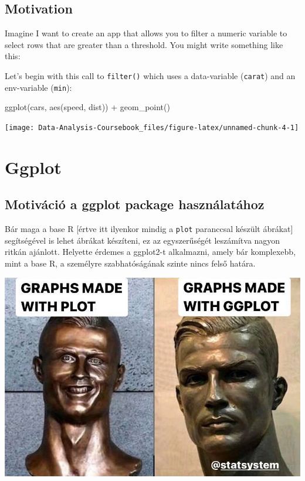 \documentclass[
]{article}
\newenvironment{Shaded}{\begin{snugshade}}{\end{snugshade}}
\newcommand{\FunctionTok}[1]{\textcolor[rgb]{0.00,0.00,0.00}{#1}}
\newcommand{\NormalTok}[1]{#1}
\newcommand{\SpecialCharTok}[1]{\textcolor[rgb]{0.00,0.00,0.00}{#1}}
\begin{document}
\hypertarget{tidy-motivation}{%
\subsection{Motivation}\label{tidy-motivation}}

Imagine I want to create an app that allows you to filter a numeric variable to select rows that are greater than a threshold.
You might write something like this:

Let's begin with this call to \texttt{filter()} which uses a data-variable (\texttt{carat}) and an env-variable (\texttt{min}):

\begin{Shaded}
\begin{Highlighting}[]
\FunctionTok{ggplot}\NormalTok{(cars, }\FunctionTok{aes}\NormalTok{(speed, dist)) }\SpecialCharTok{+} 
  \FunctionTok{geom\_point}\NormalTok{()}
\end{Highlighting}
\end{Shaded}

\begin{center}\texttt{[image: Data-Analysis-Coursebook\_files/figure-latex/unnamed-chunk-4-1]} \end{center}

\hypertarget{seminar4}{%
\section{Ggplot}\label{seminar4}}

\hypertarget{motivuxe1ciuxf3-a-ggplot-package-hasznuxe1latuxe1hoz}{%
\subsection{Motiváció a ggplot package használatához}\label{motivuxe1ciuxf3-a-ggplot-package-hasznuxe1latuxe1hoz}}

Bár maga a base R {[}értve itt ilyenkor mindig a \texttt{plot} paranccsal készült ábrákat{]} segítségével is lehet ábrákat készíteni, ez az egyszerűségét leszámítva nagyon ritkán ajánlott. Helyette érdemes a ggplot2-t alkalmazni, amely bár komplexebb, mint a base R, a személyre szabhatóságának szinte nincs felső határa.

\includegraphics{images/plot_ggplot.jpg}
\end{document}
